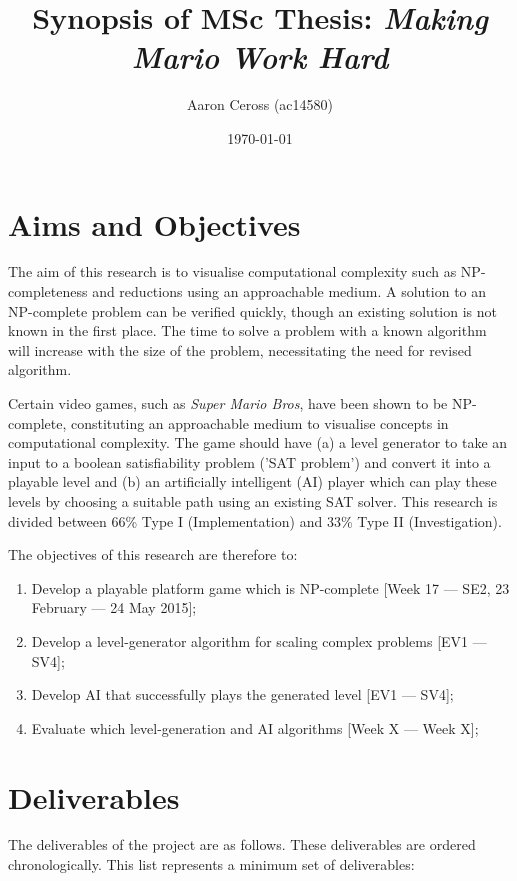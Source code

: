 \documentclass[a4paper]{article}
\title{Synopsis of MSc Thesis: \textit{Making Mario Work Hard}}
\author{Aaron Ceross (ac14580)}
\date{\today}
\begin{document}
\maketitle


\section{Aims and Objectives}

The aim of this research is to visualise computational complexity such as NP-completeness and reductions using an approachable medium. A solution to an NP-complete problem can be verified quickly, though an existing solution is not known in the first place. The time to solve a problem with a known algorithm will increase with the size of the problem, necessitating the need for revised algorithm. 
\par \noindent Certain video games, such as \textit{Super Mario Bros}, have been shown to be NP-complete, constituting an approachable medium to visualise concepts in computational complexity. The game should have (a) a level generator to take an input to a boolean satisfiability problem ('SAT problem') and convert it into a playable level and (b) an artificially intelligent (AI) player which can play these levels by choosing a suitable path using an existing SAT solver. This research is divided between 66\% Type I (Implementation) and 33\% Type II (Investigation). 
\par \noindent The objectives of this research are therefore to:
\begin{enumerate}
  \item Develop a playable platform game which is NP-complete [Week 17 --- SE2, 23 February --- 24 May 2015];
  \item Develop a level-generator algorithm for scaling complex problems [EV1 --- SV4];
  \item Develop AI that successfully plays the generated level [EV1 --- SV4];
  \item Evaluate which level-generation  and AI algorithms [Week X --- Week X];
\end{enumerate}
\section{Deliverables}

The deliverables of the project are as follows. These deliverables are ordered chronologically. This list represents a minimum set of deliverables:
\end{document}
